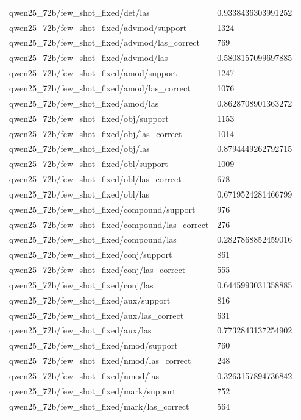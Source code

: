 \begin{tabular}{ll}
qwen25\_72b/few\_shot\_fixed/det/las & 0.9338436303991252 \\
qwen25\_72b/few\_shot\_fixed/advmod/support & 1324 \\
qwen25\_72b/few\_shot\_fixed/advmod/las\_correct & 769 \\
qwen25\_72b/few\_shot\_fixed/advmod/las & 0.5808157099697885 \\
qwen25\_72b/few\_shot\_fixed/amod/support & 1247 \\
qwen25\_72b/few\_shot\_fixed/amod/las\_correct & 1076 \\
qwen25\_72b/few\_shot\_fixed/amod/las & 0.8628708901363272 \\
qwen25\_72b/few\_shot\_fixed/obj/support & 1153 \\
qwen25\_72b/few\_shot\_fixed/obj/las\_correct & 1014 \\
qwen25\_72b/few\_shot\_fixed/obj/las & 0.8794449262792715 \\
qwen25\_72b/few\_shot\_fixed/obl/support & 1009 \\
qwen25\_72b/few\_shot\_fixed/obl/las\_correct & 678 \\
qwen25\_72b/few\_shot\_fixed/obl/las & 0.6719524281466799 \\
qwen25\_72b/few\_shot\_fixed/compound/support & 976 \\
qwen25\_72b/few\_shot\_fixed/compound/las\_correct & 276 \\
qwen25\_72b/few\_shot\_fixed/compound/las & 0.2827868852459016 \\
qwen25\_72b/few\_shot\_fixed/conj/support & 861 \\
qwen25\_72b/few\_shot\_fixed/conj/las\_correct & 555 \\
qwen25\_72b/few\_shot\_fixed/conj/las & 0.6445993031358885 \\
qwen25\_72b/few\_shot\_fixed/aux/support & 816 \\
qwen25\_72b/few\_shot\_fixed/aux/las\_correct & 631 \\
qwen25\_72b/few\_shot\_fixed/aux/las & 0.7732843137254902 \\
qwen25\_72b/few\_shot\_fixed/nmod/support & 760 \\
qwen25\_72b/few\_shot\_fixed/nmod/las\_correct & 248 \\
qwen25\_72b/few\_shot\_fixed/nmod/las & 0.3263157894736842 \\
qwen25\_72b/few\_shot\_fixed/mark/support & 752 \\
qwen25\_72b/few\_shot\_fixed/mark/las\_correct & 564 \\

\end{tabular}

